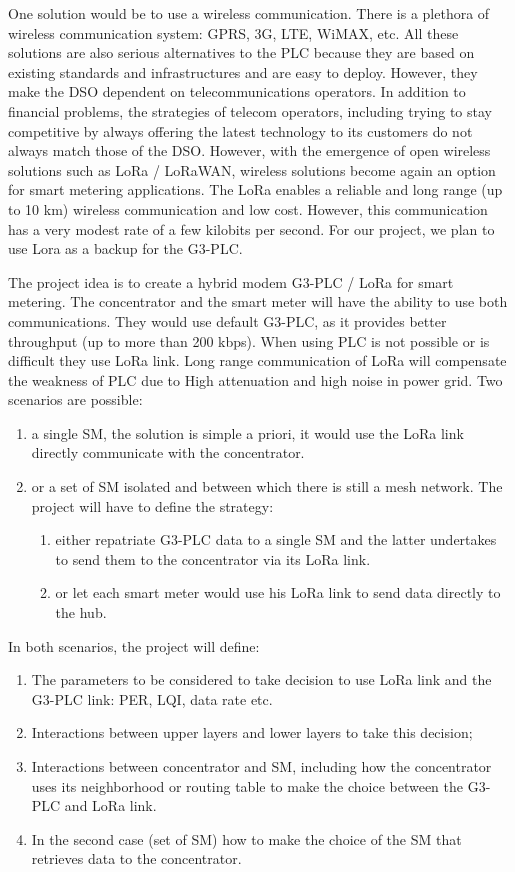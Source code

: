 \documentclass[a4paper,12pt]{article}
\begin{document}
One solution would be to use a wireless communication. There
is a plethora of wireless communication system: GPRS, 3G,
LTE, WiMAX, etc. All these solutions are also serious
alternatives to the PLC because they are based on existing
standards and infrastructures and are easy to
deploy. However, they make the DSO dependent on
telecommunications operators. In addition to financial
problems, the strategies of telecom operators, including
trying to stay competitive by always offering the latest
technology to its customers do not always match those of the
DSO. However, with the emergence of open wireless solutions
such as LoRa / LoRaWAN, wireless solutions become again an
option for smart metering applications. The LoRa enables a
reliable and long range (up to 10 km) wireless communication
and low cost. However, this communication has a very modest
rate of a few kilobits per second. For our project, we plan
to use Lora as a backup for the G3-PLC.

The project idea is to create a hybrid modem G3-PLC / LoRa
for smart metering. The concentrator and the smart meter
will have the ability to use both communications. They would
use default G3-PLC, as it provides better throughput (up to
more than 200 kbps). When using PLC is not possible or is
difficult they use LoRa link. Long range communication of
LoRa will compensate the weakness of PLC due to High
attenuation and high noise in power grid. Two scenarios are
possible:

\begin{enumerate}
  \item a single SM, the solution is simple a priori, it would use the LoRa link directly communicate with the concentrator.
  \item or a set of SM isolated and between which there is still a mesh network. The project will have to define the strategy:
    \begin{enumerate}
      \item either repatriate G3-PLC data to a single SM and the latter undertakes to send them to the concentrator via its LoRa link.
      \item or let each smart meter would use his LoRa link to send data directly to the hub.
    \end{enumerate}
\end{enumerate}

In both scenarios, the project will define:

\begin{enumerate}
\item The parameters to be considered to take decision to use LoRa link and the G3-PLC link: PER, LQI, data rate etc.
\item Interactions between upper layers and lower layers to take this decision;
\item Interactions between concentrator and SM, including how the concentrator uses its neighborhood or routing table to make the choice between the G3-PLC and LoRa link.
\item In the second case (set of SM) how to make the choice of the SM that retrieves data to the concentrator.
\end{enumerate}
\end{document}
